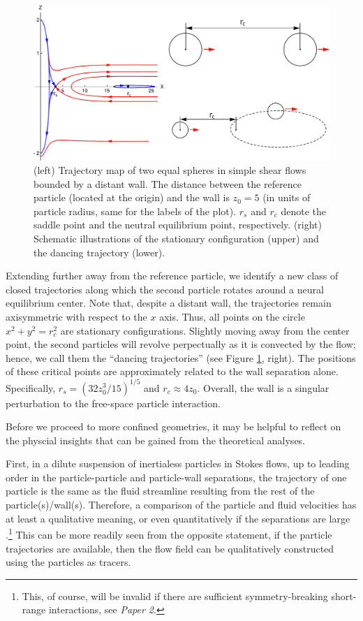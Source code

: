 \begin{figure}%
  \centering
  \includegraphics[width=\columnwidth]{itzhak-boris.pdf}
  \caption{
  (left) Trajectory map of two equal spheres in simple shear flows bounded by a distant wall. The distance between the reference particle (located at the origin) and the wall is $z_0=5$ (in units of particle radius, same for the labels of the plot). $r_s$ and $r_c$ denote the saddle point and the neutral equilibrium point, respectively.
  (right) Schematic illustrations of the stationary configuration (upper) and the dancing trajectory (lower).}
  \label{fig:itzhak-boris}
\end{figure}

Extending further away from the reference particle, we identify a new class of closed trajectories along which the second particle rotates around a neural equilibrium center. Note that, despite a distant wall, the trajectories remain axisymmetric with respect to the $x$ axis. Thus, all points on the circle $x^2+y^2=r_c^2$ are stationary configurations.
Slightly moving away from the center point, the second particles will revolve perpectually as it is convected by the flow; hence, we call them the ``dancing trajectories'' (see Figure \ref{fig:itzhak-boris}, right).
The positions of these critical points are approximately related to the wall separation alone. Specifically, $r_s=(32z_0^3/15)^{1/5}$ and $r_c \approx 4z_0$.
Overall, the wall is a singular perturbation to the free-space particle interaction.

\bigskip
Before we proceed to more confined geometries, it may be helpful to reflect on the physcial insights that can be gained from the theoretical analyses.

First, in a dilute suspension of inertialess particles in Stokes flows, up to leading order in the particle-particle and particle-wall separations, the trajectory of one particle is the same as the fluid streamline resulting from the rest of the particle(s)/wall(s). Therefore, a comparison of the particle and fluid velocities has at least a qualitative meaning, or even quantitatively if the separations are large \citep{zurita-gotor_2007}.\footnote{This, of course, will be invalid if there are sufficient symmetry-breaking short-range interactions, see \eg \emph{Paper 2}.}
This can be more readily seen from the opposite statement, \viz if the particle trajectories are available, then the flow field can be qualitatively constructed using the particles as tracers.

